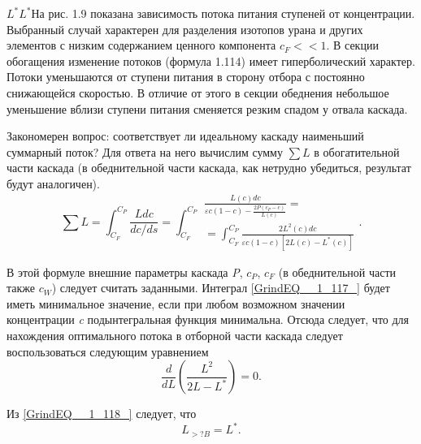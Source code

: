 
$L^{*} $$L^{*} $На рис. 1.9 показана зависимость потока питания ступеней от концентрации. Выбранный случай характерен для разделения изотопов урана и других элементов с низким содержанием ценного компонента $c_{F} <<1$. В секции обогащения изменение потоков (формула 1.114) имеет гиперболический характер. Потоки уменьшаются от ступени питания в сторону отбора с постоянно снижающейся скоростью. В отличие от этого в секции обеднения небольшое уменьшение вблизи ступени питания сменяется резким спадом у отвала каскада.

Закономерен вопрос: соответствует ли идеальному каскаду наименьший суммарный поток? Для ответа на него вычислим сумму $\sum L $ в обогатительной части каскада (в обеднительной части каскада, как нетрудно убедиться, результат будут аналогичен).
\begin{equation} \label{GrindEQ__1_117_} 
\sum L =\int _{C_{F} }^{C_{P} }\frac{Ldc}{dc/ds}  =\int _{C_{F} }^{C_{P} }\begin{array}{l} {\frac{L(c)dc}{\varepsilon c(1-c)-\frac{2P(c_{P} -c)}{L(c)} } =} \\ {=\int _{C_{F} }^{C_{P} }\frac{2L^{2} (c)dc}{\varepsilon c(1-c)\left[2L(c)-L^{*} (c)\right]}  } \end{array} .                     
\end{equation} 

В этой формуле внешние параметры каскада \textit{P}, $c_{P} $, $c_{F} $ (в обеднительной части также $c_{W} $) следует считать заданными. Интеграл \ref{GrindEQ__1_117_} будет иметь минимальное значение, если при любом возможном значении концентрации \textit{c} подынтегральная функция минимальна. Отсюда следует, что для нахождения оптимального потока в отборной части каскада следует воспользоваться следующим уравнением
\begin{equation} \label{GrindEQ__1_118_} 
\frac{d}{dL} \left(\frac{L^{2} }{2L-L^{*} } \right)=0.                                    
\end{equation} 

Из \ref{GrindEQ__1_118_} следует, что 
\begin{equation} \label{GrindEQ__1_119_} 
L_{>?B} =L^{*} .                                     
\end{equation} 

